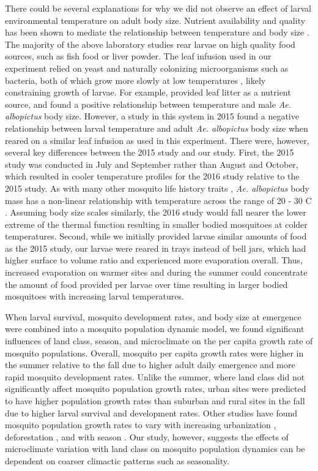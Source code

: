 \documentclass[12pt]{article}
\begin{document}
There could be several explanations for why we did not observe an effect of larval environmental temperature on adult body size. Nutrient availability and quality has been shown to mediate the relationship between temperature and body size \citep{farjana2011}. The majority of the above laboratory studies rear larvae on high quality food sources, such as fish food or liver powder. The leaf infusion used in our experiment relied on yeast and naturally colonizing microorganisms such as bacteria, both of which grow more slowly at low temperatures \citep{ratkowsky1982}, likely constraining growth of larvae. For example, \citet{lounibos2002} provided leaf litter as a nutrient source, and found a positive relationship between temperature and male \textit{Ae. albopictus} body size. However, a study in this system in 2015 found a negative relationship between larval temperature and adult \textit{Ae. albopictus} body size \citep{murdock2017} when reared on a similar leaf infusion as used in this experiment. There were, however, several key differences between the 2015 study and our study. First, the 2015 study was conducted in July and September rather than August and October, which resulted in cooler temperature profiles for the 2016 study relative to the 2015 study. As with many other mosquito life history traits \citep{mordecai2017, mordecai2013}, \textit{Ae. albopictus} body mass has a non-linear relationship with temperature across the range of 20 - 30 \degree C \citep{muturi2011c}. Assuming body size scales similarly, the 2016 study would fall nearer the lower extreme of the thermal function resulting in smaller bodied mosquitoes at colder temperatures. Second, while we initially provided larvae similar amounts of food as the 2015 study, our larvae were reared in trays instead of bell jars, which had higher surface to volume ratio and experienced more evaporation overall. Thus, increased evaporation on warmer sites and during the summer could concentrate the amount of food provided per larvae over time resulting in larger bodied mosquitoes with increasing larval temperatures.

When larval survival, mosquito development rates, and body size at emergence were combined into a mosquito population dynamic model, we found significant influences of land class, season, and microclimate on the per capita growth rate of mosquito populations. Overall, mosquito per capita growth rates were higher in the summer relative to the fall due to higher adult daily emergence and more rapid mosquito development rates. Unlike the summer, where land class did not significantly affect mosquito population growth rates, urban sites were predicted to have higher population growth rates than suburban and rural sites in the fall due to higher larval survival and development rates. Other studies have found mosquito population growth rates to vary with increasing urbanization \citep{li2014}, deforestation \citep{afrane2007}, and with season \citep{murdock2017}. Our study, however, suggests the effects of microclimate variation with land class on mosquito population dynamics can be dependent on coarser climactic patterns such as seasonality.
\end{document}
